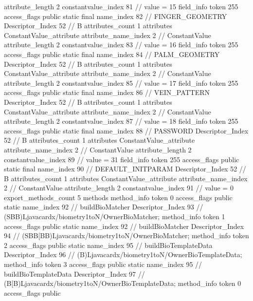 {{{{{{{					attribute_length	2
					constantvalue_index	81		// value = 15
				}
				}
			}
			field_info {
				token	255
				access_flags	public static final
				name_index	82		// FINGER_GEOMETRY
				Descriptor_Index	52		// B
				attributes_count	1
				attributes {
				ConstantValue_attribute {
					attribute_name_index	2		// ConstantValue
					attribute_length	2
					constantvalue_index	83		// value = 16
				}
				}
			}
			field_info {
				token	255
				access_flags	public static final
				name_index	84		// PALM_GEOMETRY
				Descriptor_Index	52		// B
				attributes_count	1
				attributes {
				ConstantValue_attribute {
					attribute_name_index	2		// ConstantValue
					attribute_length	2
					constantvalue_index	85		// value = 17
				}
				}
			}
			field_info {
				token	255
				access_flags	public static final
				name_index	86		// VEIN_PATTERN
				Descriptor_Index	52		// B
				attributes_count	1
				attributes {
				ConstantValue_attribute {
					attribute_name_index	2		// ConstantValue
					attribute_length	2
					constantvalue_index	87		// value = 18
				}
				}
			}
			field_info {
				token	255
				access_flags	public static final
				name_index	88		// PASSWORD
				Descriptor_Index	52		// B
				attributes_count	1
				attributes {
				ConstantValue_attribute {
					attribute_name_index	2		// ConstantValue
					attribute_length	2
					constantvalue_index	89		// value = 31
				}
				}
			}
			field_info {
				token	255
				access_flags	public static final
				name_index	90		// DEFAULT_INITPARAM
				Descriptor_Index	52		// B
				attributes_count	1
				attributes {
				ConstantValue_attribute {
					attribute_name_index	2		// ConstantValue
					attribute_length	2
					constantvalue_index	91		// value = 0
				}
				}
			}
			}
			export_methods_count	5
			methods {
				method_info {
					token	0
					access_flags	public static
					name_index	92		// buildBioMatcher
					Descriptor_Index	93		// (SBB)Ljavacardx/biometry1toN/OwnerBioMatcher;
				}
				method_info {
					token	1
					access_flags	public static
					name_index	92		// buildBioMatcher
					Descriptor_Index	94		// (SBB[BB)Ljavacardx/biometry1toN/OwnerBioMatcher;
				}
				method_info {
					token	2
					access_flags	public static
					name_index	95		// buildBioTemplateData
					Descriptor_Index	96		// (B)Ljavacardx/biometry1toN/OwnerBioTemplateData;
				}
				method_info {
					token	3
					access_flags	public static
					name_index	95		// buildBioTemplateData
					Descriptor_Index	97		// (B[B)Ljavacardx/biometry1toN/OwnerBioTemplateData;
				}
				method_info {
					token	0
					access_flags	public
}}}}}
